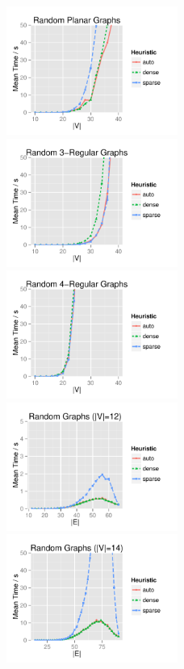 \begin{figure}[!p]
\centering
\includegraphics[width=0.5\textwidth]{data/Exp2_planar_graphs.pdf}%
\includegraphics[width=0.5\textwidth]{data/Exp2_reg3_graphs.pdf}
\includegraphics[width=0.5\textwidth]{data/Exp2_reg4_graphs.pdf}%
\includegraphics[width=0.5\textwidth]{data/Exp2_random12_graphs.pdf}
\includegraphics[width=0.5\textwidth]{data/Exp2_random14_graphs.pdf}%

\end{figure}
